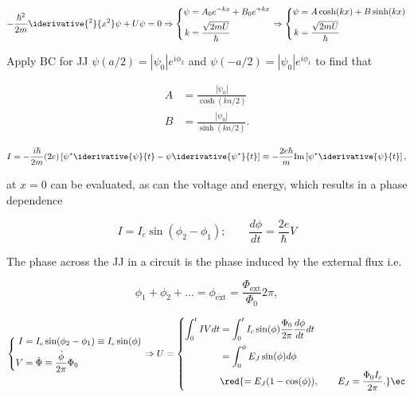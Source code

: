   \begin{equation}
    -\frac{\hbar^2}{2m}\iderivative{^2}{x^2}\psi+U\psi = 0 \Rightarrow
    \left\lbrace\begin{aligned}
        \psi & = A_0e^{-kx}+B_0e^{+kx}\\
        k & = \frac{\sqrt{2mU}}{\hbar}
      \end{aligned} \right. \Rightarrow \left\lbrace\begin{aligned}
        \psi & = A\cosh(kx)+B\sinh(kx)\\
        k & = \frac{\sqrt{2mU}}{\hbar}
      \end{aligned} \right.
  \end{equation}

  \noindent Apply BC for JJ $\psi(a/2) = \left|\psi_0\right|e^{i\phi_2}$
  and $\psi(-a/2) = \left|\psi_0\right|e^{i\phi_1}$ to find that

  \begin{align}
    A &= \frac{\left|\psi_0\right|}{\cosh(ka/2)}\\
    B &= \frac{\left|\psi_0\right|}{\sinh(ka/2)}.
  \end{align}


  \begin{equation}
    I = -\frac{i\hbar}{2m}(2e)\left[\psi^*\iderivative{\psi}{t}-\psi\iderivative{\psi^*}{t}\right] \equiv -\frac{2e\hbar}{m}\text{Im}\left[\psi^*\iderivative{\psi}{t}\right],
  \end{equation}

  \noindent at  $x=0$ can be evaluated,  as can the voltage  and energy,
  which results in a phase dependence

  \begin{equation}
    \label{l2-dcac}
    I = I_c\sin(\phi_2-\phi_1); \qquad \frac{d\phi}{dt} = \frac{2e}{\hbar}V
  \end{equation}

  The phase  across the  JJ in  a circuit  is the  phase induced  by the
  external flux i.e.

  \begin{equation}
    \label{eqn:l2-phasesum}
    \phi_1+\phi_2+\ldots = \phi_\text{ext} = \frac{\Phi_\text{ext}}{\Phi_0}2\pi,
  \end{equation}

  \begin{equation}
    \left\lbrace\begin{aligned}
        I &= I_c\sin(\phi_2-\phi_1)\equiv I_c\sin(\phi)\\
        V&=\dot{\Phi} \equiv \frac{\dot{\phi}}{2\pi}\Phi_0
      \end{aligned}\right. \Rightarrow U = \left\lbrace\begin{aligned}
        \int_{0}^{t}IV dt & = \int_{0}^{t}I_c\sin(\phi)\frac{\Phi_0}{2\pi}\frac{d\phi}{dt}dt\\
        & = \int_{0}^{\phi} E_J\sin(\phi)d\phi\\
        & \red{= E_J(1-\cos(\phi)),\qquad E_J = \frac{\Phi_0I_c}{2\pi}.}\ec
      \end{aligned}\right.
    \label{l2-JJEnergy}
  \end{equation}

